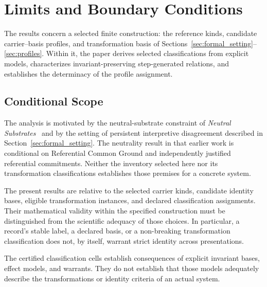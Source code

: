 
\section{Limits and Boundary Conditions}
\label{sec:limits}

The results concern a selected finite construction: the reference kinds,
candidate carrier--basis profiles, and transformation basis of
Sections~\ref{sec:formal_setting}--\ref{sec:profiles}.
Within it, the paper derives selected classifications from explicit
models, characterizes invariant-preserving step-generated relations,
and establishes the determinacy of the profile assignment.

\subsection{Conditional Scope}
\label{subsec:limits_conditional_scope}

The analysis is motivated by the neutral-substrate constraint of
\emph{Neutral Substrates}~\citep{case2026neutral} and by the setting of
persistent interpretive disagreement described in
Section~\ref{sec:formal_setting}.
The neutrality result in that earlier work is conditional on Referential
Common Ground and independently justified referential commitments.
Neither the inventory selected here nor its transformation classifications
establishes those premises for a concrete system.

The present results are relative to the selected carrier kinds,
candidate identity bases, eligible transformation instances, and
declared classification assignments.
Their mathematical validity within the specified construction must be
distinguished from the scientific adequacy of those choices.
In particular, a record's stable label, a declared basis, or a
non-breaking transformation classification does not, by itself,
warrant strict identity across presentations.

The certified classification cells establish consequences
of explicit invariant bases, effect models, and warrants.
They do not establish that those models adequately describe
the transformations or identity criteria of an actual system.

